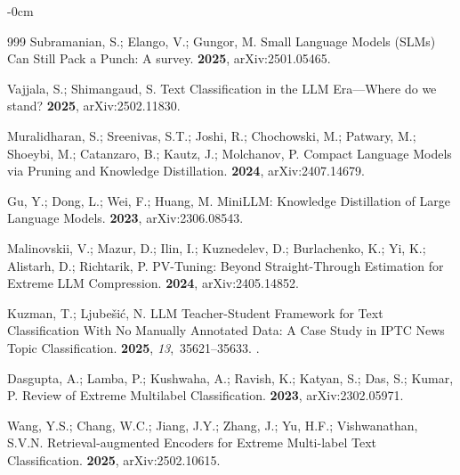 \documentclass[make,article,accept,pdftex,moreauthors]{Definitions/mdpi}
\begin{document}
\begin{adjustwidth}{-\extralength}{0cm}
\begin{thebibliography}{999}
Subramanian, S.; Elango, V.; Gungor, M.
\newblock Small Language Models (SLMs) Can Still Pack a Punch: A survey.
 {\bf 2025}, arXiv:2501.05465.

Vajjala, S.; Shimangaud, S.
\newblock Text Classification in the LLM Era---Where do we stand?
 {\bf 2025}, arXiv:2502.11830.

Muralidharan, S.; Sreenivas, S.T.; Joshi, R.; Chochowski, M.; Patwary, M.;
  Shoeybi, M.; Catanzaro, B.; Kautz, J.; Molchanov, P.
\newblock Compact Language Models via Pruning and Knowledge Distillation.
 {\bf 2024}, arXiv:2407.14679.

Gu, Y.; Dong, L.; Wei, F.; Huang, M.
\newblock MiniLLM: Knowledge Distillation of Large Language Models.
 {\bf 2023}, arXiv:2306.08543.

Malinovskii, V.; Mazur, D.; Ilin, I.; Kuznedelev, D.; Burlachenko, K.; Yi, K.;
  Alistarh, D.; Richtarik, P.
\newblock PV-Tuning: Beyond Straight-Through Estimation for Extreme LLM
  Compression.
 {\bf 2024}, arXiv:2405.14852.

Kuzman, T.; Ljubešić, N.
\newblock LLM Teacher-Student Framework for Text Classification With No
  Manually Annotated Data: A Case Study in IPTC News Topic Classification.
 {\bf 2025}, {\em 13},~35621--35633.
.

Dasgupta, A.; Lamba, P.; Kushwaha, A.; Ravish, K.; Katyan, S.; Das, S.; Kumar,
  P.
\newblock Review of Extreme Multilabel Classification.
 {\bf 2023}, arXiv:2302.05971.

Wang, Y.S.; Chang, W.C.; Jiang, J.Y.; Zhang, J.; Yu, H.F.; Vishwanathan, S.V.N.
\newblock Retrieval-augmented Encoders for Extreme Multi-label Text
  Classification.
 {\bf 2025}, arXiv:2502.10615.


\end{thebibliography}
\end{adjustwidth}
\end{document}
